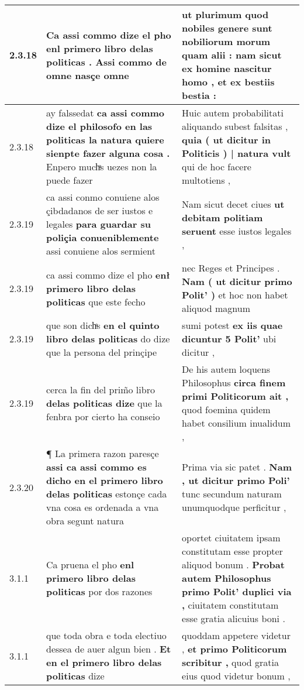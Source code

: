 \begin{tabular}{|p{1cm}|p{6.5cm}|p{6.5cm}|}
2.3.18 & Ca assi commo dize el pho \textbf{ enl primero libro delas politicas . } Assi commo de omne nasçe omne & ut plurimum quod nobiles genere sunt nobiliorum morum quam alii : \textbf{ nam sicut ex homine nascitur homo , } et ex bestiis bestia : \\\hline
2.3.18 & ay falssedat \textbf{ ca assi commo dize el philosofo en las politicas la natura quiere sienpte fazer alguna cosa . } Enpero muchͣs uezes non la puede fazer & Huic autem probabilitati aliquando subest falsitas , \textbf{ quia ( ut dicitur in Politicis ) | natura vult } qui de hoc facere multotiens , \\\hline
2.3.19 & ca assi conmo conuiene alos çibdadanos de ser iustos e legales \textbf{ para guardar su poliçia conueniblemente } assi conuiene alos sermient & Nam sicut decet ciues \textbf{ ut debitam politiam seruent } esse iustos legales , \\\hline
2.3.19 & ca assi commo dize el pho \textbf{ enł primero libro delas politicas } que este fecho & nec Reges et Principes . \textbf{ Nam ( ut dicitur primo Polit’ ) } et hoc non habet aliquod magnum \\\hline
2.3.19 & que son dichͣs \textbf{ en el quinto libro delas politicas } do dize que la persona del prinçipe & sumi potest \textbf{ ex iis quae dicuntur 5 Polit’ } ubi dicitur , \\\hline
2.3.19 & cerca la fin del prim̃o libro \textbf{ delas politicas dize } que la fenbra por cierto ha conseio & De his autem loquens Philosophus \textbf{ circa finem primi Politicorum ait , } quod foemina quidem habet consilium inualidum , \\\hline
2.3.20 & ¶ La primera razon paresçe \textbf{ assi ca assi commo es dicho en el primero libro delas politicas } estonçe cada vna cosa es ordenada a vna obra segunt natura & Prima via sic patet . \textbf{ Nam , ut dicitur primo Poli’ } tunc secundum naturam unumquodque perficitur , \\\hline
3.1.1 & Ca pruena el pho \textbf{ enl primero libro delas politicas } por dos razones & oportet ciuitatem ipsam constitutam esse propter aliquod bonum . \textbf{ Probat autem Philosophus primo Polit’ duplici via , } ciuitatem constitutam esse gratia alicuius boni . \\\hline
3.1.1 & que toda obra e toda electiuo dessea de auer algun bien . \textbf{ Et en el primero libro delas politicas } dize & quoddam appetere videtur , \textbf{ et primo Politicorum scribitur , } quod gratia eius quod videtur bonum , \\\hline

\end{tabular}
